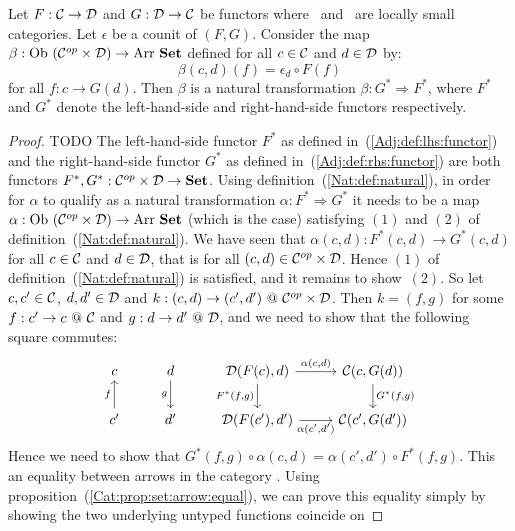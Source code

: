 \begin{prop}\label{Adj:prop:natural:right:left}
    Let $F:\mbox{$\cal C$}\to\mbox{$\cal D$}$ and $G:\mbox{$\cal D$}\to\mbox{$\cal C$}$ be functors where \Cat\ and \Dat\ 
    are locally small categories. Let $\epsilon$ be a counit of $(F,G)$. 
    Consider the map $\beta:\ob\ (\Cop\times\Dat)\to\arr\ \Set$ defined 
    for all $c\in\mbox{$\cal C$}$ and $d\in\mbox{$\cal D$}$ by:
        \[
            \beta(c,d)(f)=\epsilon_{d}\circ F(f)
        \]
    for all $f:c\to G(d)$. Then $\beta$ is a natural transformation 
    $\beta:G^{*}\Rightarrow F^{*}$, where $F^{*}$ and $G^{*}$ denote
    the left-hand-side and right-hand-side functors respectively.
\end{prop}
\begin{proof}TODO
    The left-hand-side functor $F^{*}$ as defined in~(\ref{Adj:def:lhs:functor})
    and the right-hand-side functor $G^{*}$ as defined 
    in~(\ref{Adj:def:rhs:functor}) are both functors 
    $F^{*},G^{*}:\mbox{${\cal C}^{op}$}\times\mbox{$\cal D$}\to\mbox{\bf Set}$. Using definition~(\ref{Nat:def:natural}),
    in order for $\alpha$ to qualify as a natural transformation 
    $\alpha:F^{*}\Rightarrow G^{*}$ it needs to be a map
    $\alpha:\ob\ (\Cop\times\Dat)\to\arr\ \Set$ (which is the case) satisfying
    $(1)$ and $(2)$ of definition~(\ref{Nat:def:natural}). We have
    seen that $\alpha(c,d):F^{*}(c,d)\to G^{*}(c,d)$ for all $c\in\mbox{$\cal C$}$
    and $d\in\mbox{$\cal D$}$, that is for all $(c,d)\in\mbox{${\cal C}^{op}$}\times\mbox{$\cal D$}$. Hence $(1)$ of
    definition~(\ref{Nat:def:natural}) is satisfied, and it remains to show~$(2)$.
    So let $c,c'\in\mbox{$\cal C$}$, $d,d'\in\mbox{$\cal D$}$ and $k:(c,d)\to(c',d')\ @\ \mbox{${\cal C}^{op}$}\times\mbox{$\cal D$}$.
    Then $k=(f,g)$ for some $f:c'\to c\ @\ \mbox{$\cal C$}$ and $g:d \to d'\ @\ \mbox{$\cal D$}$, and
    we need to show that the following square commutes:
    \[
        \begin{tikzcd}
            c
            &d\arrow[d,swap, "g"]
            &\Dat(F(c),d)\arrow[r, "\alpha\mbox{$(c,d)$}"]
             \arrow[d, swap,"F^{*}\mbox{$(f,g)$}"]
            &\Cat(c,G(d))
             \arrow[d, "G^{*}\mbox{$(f,g)$}"]
            \\
            c'\arrow[u, "f"]
            &d'
            &\Dat(F(c'),d')\arrow[r, swap, "\alpha\mbox{$(c',d')$}"]
            &\Cat(c',G(d'))
        \end{tikzcd}
    \]
    Hence we need to show that $G^{*}(f,g)\circ\alpha(c,d)=\alpha(c',d')\circ
    F^{*}(f,g)$. This an equality between arrows in the category \Set. Using
    proposition~(\ref{Cat:prop:set:arrow:equal}), we can prove this equality
    simply by showing the two underlying untyped functions coincide on 

\end{proof}
